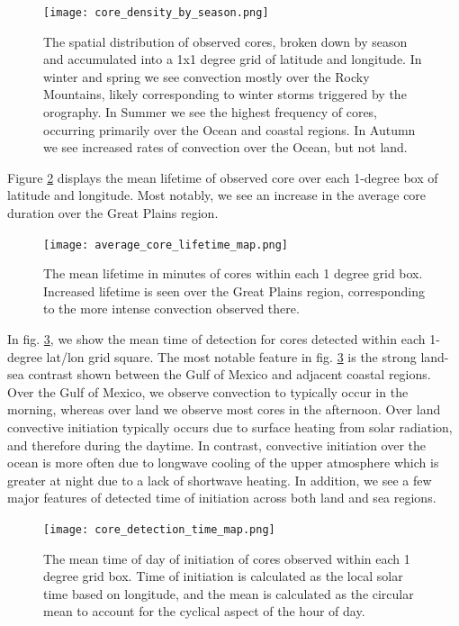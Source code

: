 \begin{figure}[h]
    \centering
    \texttt{[image: core\_density\_by\_season.png]}
    \caption{The spatial distribution of observed cores, broken down by season and accumulated into a 1x1 degree grid of latitude and longitude. In winter and spring we see convection mostly over the Rocky Mountains, likely corresponding to winter storms triggered by the orography. In Summer we see the highest frequency of cores, occurring primarily over the Ocean and coastal regions. In Autumn we see increased rates of convection over the Ocean, but not land. }
    \label{fig:spatial_density_by_season}
\end{figure}

Figure \ref{fig:core_lifetime_map} displays the mean lifetime of observed core over each 1-degree box of latitude and longitude.
Most notably, we see an increase in the average core duration over the Great Plains region.

\begin{figure}[h]
    \centering
    \texttt{[image: average\_core\_lifetime\_map.png]}
    \caption{The mean lifetime in minutes of cores within each 1 degree grid box. Increased lifetime is seen over the Great Plains region, corresponding to the more intense convection observed there.}
    \label{fig:core_lifetime_map}
\end{figure}

In fig. \ref{fig:core_tod_map}, we show the mean time of detection for cores detected within each 1-degree lat/lon grid square.
The most notable feature in fig. \ref{fig:core_tod_map} is the strong land-sea contrast shown between the Gulf of Mexico and adjacent coastal regions.
Over the Gulf of Mexico, we observe convection to typically occur in the morning, whereas over land we observe most cores in the afternoon.
Over land convective initiation typically occurs due to surface heating from solar radiation, and therefore during the daytime.
In contrast, convective initiation over the ocean is more often due to longwave cooling of the upper atmosphere which is greater at night due to a lack of shortwave heating.
In addition, we see a few major features of detected time of initiation across both land and sea regions.

\begin{figure}[t]
    \centering
    \texttt{[image: core\_detection\_time\_map.png]}
    \caption{The mean time of day of initiation of cores observed within each 1 degree grid box. Time of initiation is calculated as the local solar time based on longitude, and the mean is calculated as the circular mean to account for the cyclical aspect of the hour of day.}
    \label{fig:core_tod_map}
\end{figure}


